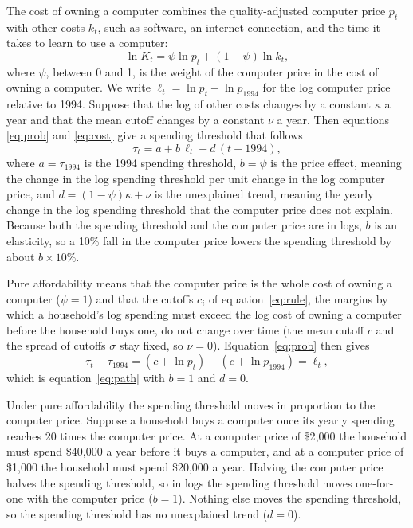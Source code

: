 \documentclass[11pt]{article}
\begin{document}
The cost of owning a computer combines the quality-adjusted computer price $p_t$ with other costs $k_t$, such as software, an internet connection, and the time it takes to learn to use a computer:
\begin{equation}
\ln K_t = \psi \ln p_t + (1 - \psi) \ln k_t,
\label{eq:cost}
\end{equation}
where $\psi$, between 0 and 1, is the weight of the computer price in the cost of owning a computer. We write $\ell_t = \ln p_t - \ln p_{1994}$ for the log computer price relative to 1994. Suppose that the log of other costs changes by a constant $\kappa$ a year and that the mean cutoff changes by a constant $\nu$ a year. Then equations \eqref{eq:prob} and \eqref{eq:cost} give a spending threshold that follows
\begin{equation}
\tau_t = a + b\,\ell_t + d\,(t - 1994),
\label{eq:path}
\end{equation}
where $a = \tau_{1994}$ is the 1994 spending threshold, $b = \psi$ is the price effect, meaning the change in the log spending threshold per unit change in the log computer price, and $d = (1 - \psi)\kappa + \nu$ is the unexplained trend, meaning the yearly change in the log spending threshold that the computer price does not explain. Because both the spending threshold and the computer price are in logs, $b$ is an elasticity, so a 10\% fall in the computer price lowers the spending threshold by about $b \times 10\%$.

Pure affordability means that the computer price is the whole cost of owning a computer ($\psi = 1$) and that the cutoffs $c_i$ of equation~\eqref{eq:rule}, the margins by which a household's log spending must exceed the log cost of owning a computer before the household buys one, do not change over time (the mean cutoff $c$ and the spread of cutoffs $\sigma$ stay fixed, so $\nu = 0$). Equation~\eqref{eq:prob} then gives
\begin{equation}
\tau_t - \tau_{1994} = (c + \ln p_t) - (c + \ln p_{1994}) = \ell_t,
\label{eq:pure}
\end{equation}
which is equation~\eqref{eq:path} with $b = 1$ and $d = 0$.

Under pure affordability the spending threshold moves in proportion to the computer price. Suppose a household buys a computer once its yearly spending reaches 20 times the computer price. At a computer price of \$2{,}000 the household must spend \$40{,}000 a year before it buys a computer, and at a computer price of \$1{,}000 the household must spend \$20{,}000 a year. Halving the computer price halves the spending threshold, so in logs the spending threshold moves one-for-one with the computer price ($b = 1$). Nothing else moves the spending threshold, so the spending threshold has no unexplained trend ($d = 0$).
\end{document}
